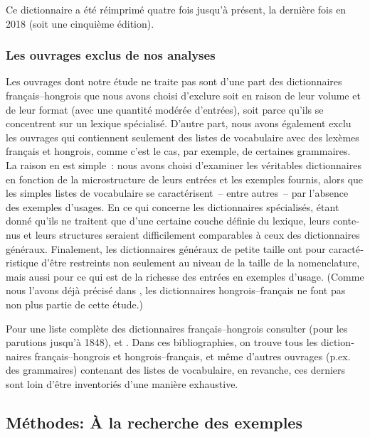 \documentclass[output=paper,colorlinks,citecolor=brown,arabicfont,chinesefont,booklanguage=french]{langscibook}
\begin{document}
\begin{otherlanguage}{french}
Ce dictionnaire a été réimprimé quatre fois jusqu’à présent, la dernière fois en 2018 (soit une cinquième édition).

\subsubsection{Les ouvrages exclus de nos analyses}\label{sec:tillinger:2.1.10}

Les ouvrages dont notre étude ne traite pas sont d’une part des dictionnaires français–hongrois que nous avons choisi d’exclure soit en raison de leur volume et de leur format (avec une quantité modérée d’entrées), soit parce qu’ils se concentrent sur un lexique spécialisé. D’autre part, nous avons également exclu les ouvrages qui contiennent seulement des listes de vocabulaire avec des lexèmes français et hongrois, comme c’est le cas, par exemple, de certaines grammaires. La raison en est simple~: nous avons choisi d’examiner les véritables dictionnaires en fonction de la microstructure de leurs entrées et les exemples fournis, alors que les simples listes de vocabulaire se caractérisent~-- entre autres~-- par l’absence des exemples d’usages. En ce qui concerne les dictionnaires spécialisés, étant donné qu’ils ne traitent que d’une certaine couche définie du lexique, leurs contenus et leurs structures seraient difficilement comparables à ceux des dictionnaires généraux. Finalement, les dictionnaires généraux de petite taille ont pour caractéristique d’être restreints non seulement au niveau de la taille de la nomenclature, mais aussi pour ce qui est de la richesse des entrées en exemples d’usage. (Comme nous l’avons déjà précisé dans , les dictionnaires hongrois–français ne font pas non plus partie de cette étude.)

Pour une liste complète des dictionnaires français–hongrois consulter \citealt{Jezerniczky1933}  (pour les parutions jusqu’à 1848), \citealt{Sagi1922}  et \citealt{Magay2011} . Dans ces bibliographies, on trouve tous les dictionnaires français–hongrois et hongrois–français, et même d’autres ouvrages (p.ex. des grammaires) contenant des listes de vocabulaire, en revanche, ces derniers sont loin d’être inventoriés d’une manière exhaustive.

\subsection{Méthodes: À la recherche des exemples}\label{sec:tillinger:2.2}


\end{otherlanguage}
\end{document}
